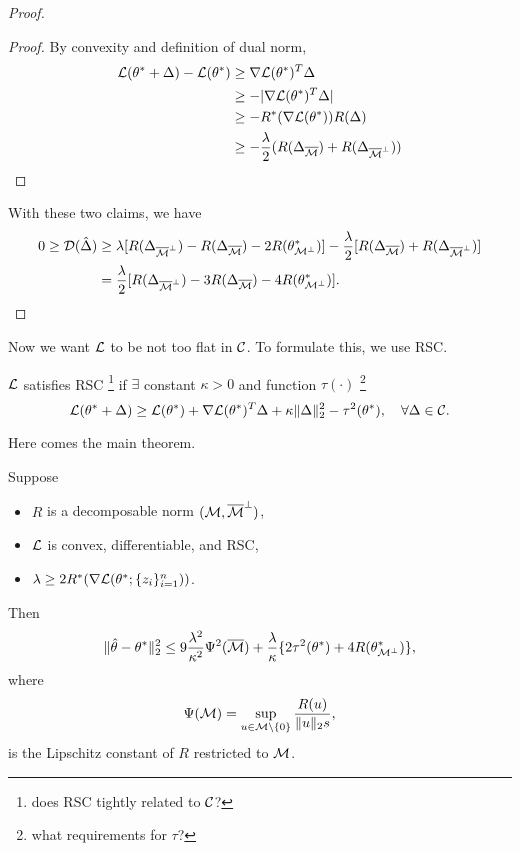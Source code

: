 \begin{proof}
    \begin{proof}
        By convexity and definition of dual norm,
        \begin{align}
            \mathcal{L}(\theta^*+\Delta)-\mathcal{L}(\theta^*) & \ge \nabla\mathcal{L}(\theta^*)^T\Delta \\
                & \ge-|\nabla\mathcal{L}(\theta^*)^T\Delta| \\
                & \ge -R^*(\nabla\mathcal{L}(\theta^*))R(\Delta)    \\
                & \ge -\frac{\lambda}{2}(R(\Delta_{{\overline{\mathcal{M}}}})+R(\Delta_{{\overline{\mathcal{M}}}^\perp}))
        \end{align}
    \end{proof}

    With these two claims, we have
    \begin{equation}
    \begin{split}
    0 \ge \mathcal{D}({\hat\Delta}) & \ge \lambda[R(\Delta_{{\overline{\mathcal{M}}}^\perp})-R(\Delta_{{\overline{\mathcal{M}}}})-2R(\theta^*_{\mathcal{M}^\perp})]
        -\frac{\lambda}{2}[R(\Delta_{{\overline{\mathcal{M}}}})+R(\Delta_{{\overline{\mathcal{M}}}^\perp})]  \\
    & = \frac{\lambda}{2}[R(\Delta_{{\overline{\mathcal{M}}}^\perp})-3R(\Delta_{{\overline{\mathcal{M}}}})-4R(\theta^*_{\mathcal{M}^\perp})].
    \end{split}
    \end{equation}
\end{proof}

Now we want $\mathcal{L}$ to be not too flat in $\mathcal{C}$.
To formulate this, we use RSC.

\begin{define}
    $\mathcal{L}$ satisfies RSC
    \footnote{does RSC tightly related to $\mathcal{C}$?}
    if $\exists$ constant $\kappa > 0$ and function $\tau(\cdot)$
    \footnote{what requirements for $\tau$?}
    \st
    \begin{equation}
        \mathcal{L}(\theta^*+\Delta)\ge \mathcal{L}(\theta^*) + \nabla \mathcal{L}(\theta^*)^T\Delta + \kappa\|\Delta\|_2^2-\tau^2(\theta^*),\quad \forall \Delta\in\mathcal{C}.
    \end{equation}
\end{define}

Here comes the main theorem.

\begin{thm}
Suppose
\begin{itemize}
    \item $R$ is a decomposable norm \wrt $(\mathcal{M}, {\overline{\mathcal{M}}}^\perp)$,
    \item $\mathcal{L}$ is convex, differentiable, and RSC,
    \item $\lambda\ge 2R^*(\nabla\mathcal{L}(\theta^*;\{z_i\}_{i=1}^n))$.
\end{itemize}
Then
\begin{equation}
    \|{\hat{\theta}}-\theta^*\|_2^2\le 9\frac{\lambda^2}{\kappa^2}\Psi^2({\overline{\mathcal{M}}})
        + \frac{\lambda}{\kappa}\{2\tau^2(\theta^*)+4R(\theta^*_{\mathcal{M}^\perp})\},
\end{equation}
where
\begin{equation}
    \Psi(\mathcal{M})=\sup_{u\in\mathcal{M}\backslash\{0\}}\frac{R(u)}{\|u\|_2s},
\end{equation}
is the Lipschitz constant of $R$ restricted to $\mathcal{M}$.
\end{thm}

